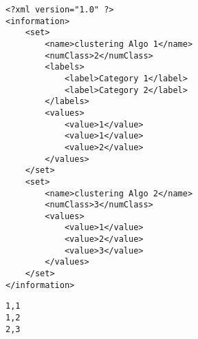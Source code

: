 \documentclass[10pt]{bmc_article}
\newenvironment{bmcformat}{\baselineskip20pt\sloppy\setboolean{publ}{false}}{\baselineskip20pt\sloppy}
\begin{document}
\begin{bmcformat}
\begin{lstlisting}[float,caption=XML information layer file,label=xmlinfo]
<?xml version="1.0" ?>
<information>
	<set>
		<name>clustering Algo 1</name>
		<numClass>2</numClass>
		<labels>
			<label>Category 1</label>
			<label>Category 2</label>
		</labels>
		<values>
			<value>1</value>
			<value>1</value>
			<value>2</value>
		</values>
	</set>
	<set>
		<name>clustering Algo 2</name>
		<numClass>3</numClass>
		<values>
			<value>1</value>
			<value>2</value>
			<value>3</value>
		</values>
	</set>
</information>

\end{lstlisting}

\begin{lstlisting}[float,caption=CSV information layer file,label=csvinfo]
1,1
1,2
2,3
\end{lstlisting}








\end{bmcformat}
\end{document}
